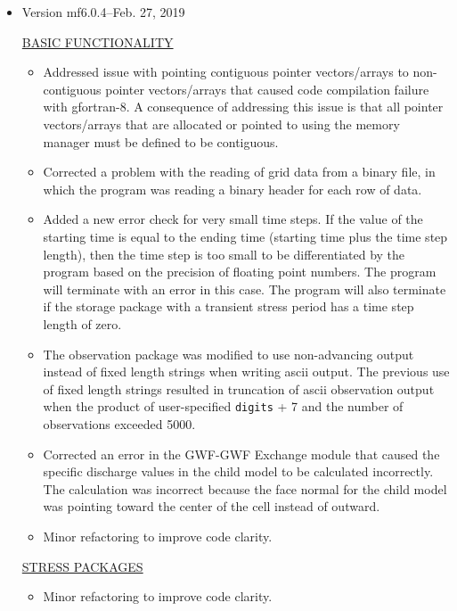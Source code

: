 \begin{itemize}
	\item Version mf6.0.4--Feb. 27, 2019
	
	\underline{BASIC FUNCTIONALITY}
	\begin{itemize}
		\item Addressed issue with pointing contiguous pointer vectors/arrays to non-contiguous pointer vectors/arrays that caused code compilation failure with gfortran-8. A consequence of addressing this issue is that all pointer vectors/arrays that are allocated or pointed to using the memory manager must be defined to be contiguous.
		\item Corrected a problem with the reading of grid data from a binary file, in which the program was reading a binary header for each row of data.
		\item Added a new error check for very small time steps.  If the value of the starting time is equal to the ending time (starting time plus the time step length), then the time step is too small to be differentiated by the program based on the precision of floating point numbers.  The program will terminate with an error in this case.  The program will also terminate if the storage package with a transient stress period has a time step length of zero.
		\item The observation package was modified to use non-advancing output instead of fixed length strings when writing ascii output. The previous use of fixed length strings resulted in truncation of ascii observation output when the product of user-specified \texttt{digits} + 7 and the number of observations exceeded 5000.
		\item Corrected an error in the GWF-GWF Exchange module that caused the specific discharge values in the child model to be calculated incorrectly.  The calculation was incorrect because the face normal for the child model was pointing toward the center of the cell instead of outward.
		\item Minor refactoring to improve code clarity.
	\end{itemize}
	
	\underline{STRESS PACKAGES}
	\begin{itemize}
		\item Minor refactoring to improve code clarity.
	\end{itemize}
	

\end{itemize}
